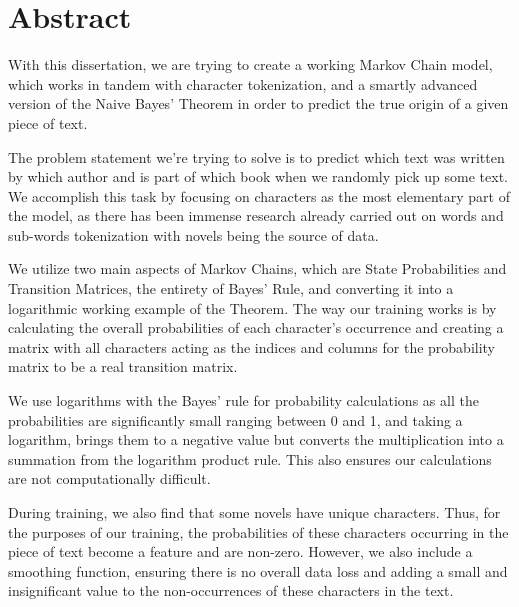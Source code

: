 \documentclass[11pt,a4paper,twoside,openright]{report}
\begin{document}
\maketitle

\chapter*{Abstract}

With this dissertation, we are trying to create a working Markov Chain model, which works in tandem with character tokenization, and a smartly advanced version of the Naive Bayes' Theorem in order to predict the true origin of a given piece of text.

The problem statement we're trying to solve is to predict which text was written by which author and is part of which book when we randomly pick up some text. We accomplish this task by focusing on characters as the most elementary part of the model, as there has been immense research already carried out on words and sub-words tokenization with novels being the source of data.

We utilize two main aspects of Markov Chains, which are State Probabilities and Transition Matrices, the entirety of Bayes' Rule, and converting it into a logarithmic working example of the Theorem. The way our training works is by calculating the overall probabilities of each character's occurrence and creating a matrix with all characters acting as the indices and columns for the probability matrix to be a real transition matrix.

We use logarithms with the Bayes' rule for probability calculations as all the probabilities are significantly small ranging between 0 and 1, and taking a logarithm, brings them to a negative value but converts the multiplication into a summation from the logarithm product rule. This also ensures our calculations are not computationally difficult.

During training, we also find that some novels have unique characters. Thus, for the purposes of our training, the probabilities of these characters occurring in the piece of text become a feature and are non-zero. However, we also include a smoothing function, ensuring there is no overall data loss and adding a small and insignificant value to the non-occurrences of these characters in the text. 
\end{document}

